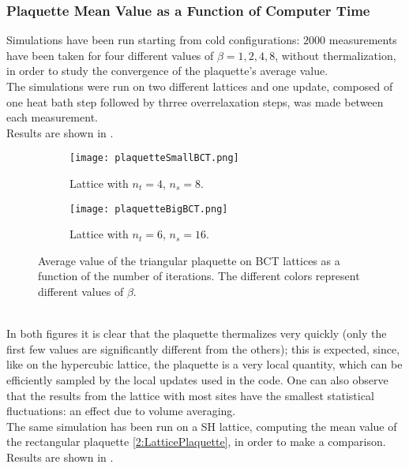 \subsubsection{Plaquette Mean Value as a Function of Computer Time}
Simulations have been run starting from cold configurations: $2000$ measurements have been taken for four different values of $\beta=1,2,4,8$, without thermalization, in order to study the convergence of the plaquette's average value.\\
The simulations were run on two different lattices and one update, composed of one heat bath step followed by thrree overrelaxation steps, was made between each measurement.\\
Results are shown in .
\begin{figure}[!htbp]
    \centering
    \begin{subfigure}[b]{0.49\textwidth}
        \texttt{[image: plaquetteSmallBCT.png]}
        \caption{Lattice with $n_t=4$, $n_s=8$.}
        \label{4F:PlaqIterSmallBCT}
    \end{subfigure}
    \begin{subfigure}[b]{0.49\textwidth}
        \texttt{[image: plaquetteBigBCT.png]}
        \caption{Lattice with $n_t=6$, $n_s=16$.}
        \label{4F:PlaqIterBigBCT}
    \end{subfigure}
    \caption{Average value of the triangular plaquette on BCT lattices as a function of the number of iterations. The different colors represent different values of $\beta$.}
    \label{4F:PlaqIterBCT}
\end{figure}\\
In both figures it is clear that the plaquette thermalizes very quickly (only the first few values are significantly different from the others); this is expected, since, like on the hypercubic lattice, the plaquette is a very local quantity, which can be efficiently sampled by the local updates used in the code.
One can also observe that the results from the lattice with most sites have the smallest statistical fluctuations: an effect due to volume averaging.\\
The same simulation has been run on a SH lattice, computing the mean value of the rectangular plaquette \eqref{2:LatticePlaquette}, in order to make a comparison.\\
Results are shown in .
